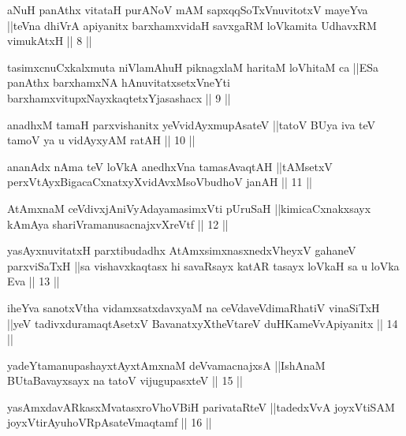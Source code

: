 
\begin{kandikeshl}
aNuH panAthx vitataH purANoV mAM sapxqqSoTxV\s nuvitotxV mayeYva ||teVna dhiVrA apiyanitx barxhamxvidaH savxgaRM loVkamita UdhavxRM vimukAtxH || 8 ||
\end{kandikeshl}

\begin{kandikeshl}
tasimxcnuCxkalxmuta niVlamAhuH piknagxlaM haritaM loVhitaM ca ||ESa panAthx barxhamxNA hAnuvitatxsetxVneYti barxhamxvitupxNayxkaqtetxYjasashacx || 9 ||
\end{kandikeshl}

\begin{kandikeshl}
anadhxM tamaH parxvishanitx yeV\s vidAyxmupAsateV ||tatoV BUya iva teV tamoV ya u vidAyxyAM ratAH || 10 ||
\end{kandikeshl}

\begin{kandikeshl}
ananAdx nAma teV loVkA anedhxVna tamasAvaqtAH ||tAMsetxV perxVtAyxBigacaCxnatxyXvidAvxMsoV\s budhoV janAH || 11 ||
\end{kandikeshl}

\begin{kandikeshl}
AtAmxnaM ceVdivxjAniVyAdayamasimxVti pUruSaH ||kimicaCxnakxsayx kAmAya shariVramanusacnajxvXreVtf || 12 ||
\end{kandikeshl}

\begin{kandikeshl}
yasAyxnuvitatxH parxtibudadhx AtAmxsimxnasxnedxVheyxV gahaneV parxviSaTxH ||sa vishavxkaqtasx hi savaRsayx katAR tasayx loVkaH sa u loVka Eva || 13 ||
\end{kandikeshl}

\begin{kandikeshl}
iheYva sanotxV\s tha vidamxsatxdavxyaM na ceVdaveVdimaRhatiV vinaSiTxH ||yeV tadivxduramaqtAsetxV BavanatxyXtheVtareV duHKameVvApiyanitx || 14 ||
\end{kandikeshl}

\begin{kandikeshl}
yadeYtamanupashayxtAyxtAmxnaM deVvamacnajxsA ||IshAnaM BUtaBavayxsayx na tatoV vijugupasxteV || 15 ||
\end{kandikeshl}

\begin{kandikeshl}
yasAmxdavARkasxMvatasxroV\s hoVBiH parivataRteV ||tadedxVvA joyxVtiSAM joyxVtirAyuhoVRpAsateV\s maqtamf || 16 ||
\end{kandikeshl}

